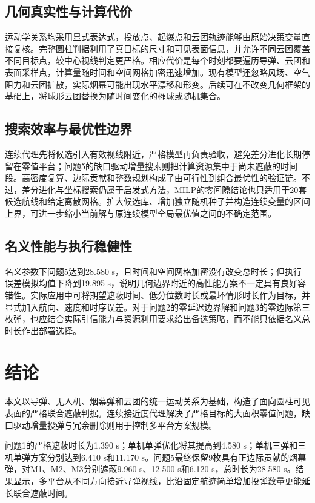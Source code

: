 \documentclass[12pt,a4paper]{ctexart}
\begin{document}
\subsection{几何真实性与计算代价}

运动学关系均采用显式表达式，投放点、起爆点和云团轨迹能够由原始决策变量直接复核。完整圆柱判据利用了真目标的尺寸和可见表面信息，并允许不同云团覆盖不同目标点，较中心视线判定更严格。相应代价是每个时刻都要遍历导弹、云团和表面采样点，计算量随时间和空间网格加密迅速增加。现有模型还忽略风场、空气阻力和云团扩散，实际烟幕可能出现水平漂移和形变。后续可在不改变几何框架的基础上，将球形云团替换为随时间变化的椭球或随机集合。

\subsection{搜索效率与最优性边界}

连续代理先将候选引入有效视线附近，严格模型再负责验收，避免差分进化长期停留在零值平台；问题5的缺口驱动增量搜索则把计算资源集中于尚未遮蔽的时间段。高密度复算、边际贡献和整数规划构成了由可行性到组合最优性的验证链。不过，差分进化与坐标搜索仍属于启发式方法，MILP的零间隙结论也只适用于20套候选航线和给定离散网格。扩大候选库、增加独立随机种子并构造连续变量的区间上界，可进一步缩小当前解与原连续模型全局最优值之间的不确定范围。

\subsection{名义性能与执行稳健性}

名义参数下问题5达到28.580 s，且时间和空间网格加密没有改变总时长；但执行误差模拟均值下降到19.895 s，说明几何边界附近的高性能方案不一定具有良好容错性。实际应用中可将期望遮蔽时间、低分位数时长或最坏情形时长作为目标，并显式加入航向、速度和时序误差。对于问题2的零延迟边界解和问题3的零边际第三枚弹，也应结合实际引信能力与资源利用要求给出备选策略，而不能只依据名义总时长作出部署选择。

\section{结论}

本文以导弹、无人机、烟幕弹和云团的统一运动关系为基础，构造了面向圆柱可见表面的严格联合遮蔽判据。连续接近度代理解决了严格目标的大面积零值问题，缺口驱动增量投弹与冗余删除则用于控制多平台方案规模。

问题1的严格遮蔽时长为1.390 s；单机单弹优化将其提高到4.580 s；单机三弹和三机单弹方案分别达到6.410 s和11.170 s。问题5最终保留9枚具有正边际贡献的烟幕弹，对M1、M2、M3分别遮蔽9.960 s、12.500 s和6.120 s，总时长为28.580 s。结果显示，多平台从不同方向接近导弹视线，比沿固定航迹简单增加投弹数量更能延长联合遮蔽时间。
\end{document}
